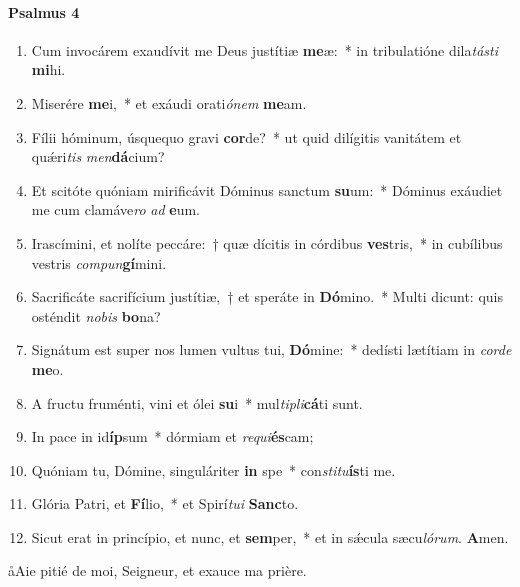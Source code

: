 \documentclass[twoside]{article}
\begin{document}
\begin{paracol}[1]{2}
\paragraph{Psalmus 4}
\begin{enumerate}[wide, itemsep=0mm, labelwidth=!, labelindent=0pt, label=\color{gregoriocolor}\theenumi]
\item Cum invocárem exaudívit me Deus justítiæ \textbf{me}æ:~* in tribulatióne dila\textit{tás}\textit{ti} \textbf{mi}hi.
\item Miserére \textbf{me}i,~* et exáudi orati\textit{ó}\textit{nem} \textbf{me}am.
\item Fílii hóminum, úsquequo gravi \textbf{cor}de?~* ut quid dilígitis vanitátem et quǽri\textit{tis} \textit{men}\textbf{dá}cium?
\item Et scitóte quóniam mirificávit Dóminus sanctum \textbf{su}um:~* Dóminus exáudiet me cum clamáve\textit{ro} \textit{ad} \textbf{e}um.
\item Irascímini, et nolíte peccáre:~† quæ dícitis in córdibus \textbf{ves}tris,~* in cubílibus vestris \textit{com}\textit{pun}\textbf{gí}mini.
\item Sacrificáte sacrifícium justítiæ,~† et speráte in \textbf{Dó}mino.~* Multi dicunt: quis osténdit \textit{no}\textit{bis} \textbf{bo}na?
\item Signátum est super nos lumen vultus tui, \textbf{Dó}mine:~* dedísti lætítiam in \textit{cor}\textit{de} \textbf{me}o.
\item A fructu fruménti, vini et ólei \textbf{su}i~* mul\textit{ti}\textit{pli}\textbf{cá}ti sunt.
\item In pace in id\textbf{íp}sum~* dórmiam et \textit{re}\textit{qui}\textbf{és}cam;
\item Quóniam tu, Dómine, singuláriter \textbf{in} spe~* con\textit{sti}\textit{tu}\textbf{ís}ti me.
\item Glória Patri, et \textbf{Fí}lio,~* et Spirí\textit{tu}\textit{i} \textbf{Sanc}to.
\item Sicut erat in princípio, et nunc, et \textbf{sem}per,~* et in sǽcula sæcu\textit{ló}\textit{rum}. \textbf{A}men.
\end{enumerate}

\switchcolumn

\aa Aie pitié de moi, Seigneur, et exauce ma prière.


\end{paracol}
\end{document}
